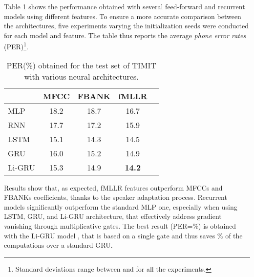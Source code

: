 \documentclass{article}
\begin{document}
Table \ref{tab:res1} shows the performance obtained with several feed-forward and recurrent models using different features. To ensure a more accurate comparison between the architectures, five experiments varying the initialization seeds were conducted for each 
model and feature. The table thus reports the average \textit{phone error rates} (PER)\footnote{Standard deviations range between  and  for all the experiments.}.
\begin{table}[t!]
\caption{PER(\%) obtained for the test set of TIMIT with various neural architectures.}
\centering

\begin{tabular}{l|cccc}  
& MFCC &  FBANK & fMLLR \\ \hline
MLP & 18.2  & 18.7 & 16.7   \\ 
RNN & 17.7  & 17.2  & 15.9   \\ 
LSTM & 15.1  & 14.3  & 14.5   \\ 
GRU & 16.0  & 15.2  & 14.9   \\ 
Li-GRU & 15.3 & 14.9 & \textbf{14.2} \\
\bottomrule
\end{tabular}
\label{tab:res1}
\end{table}
Results show that, as expected, fMLLR features outperform MFCCs and FBANKs coefficients, thanks to the speaker adaptation process. Recurrent models significantly outperform the standard MLP one, especially when using LSTM, GRU, and Li-GRU architecture, that effectively address gradient vanishing through multiplicative gates. The best result (PER=\%) is obtained with the Li-GRU model \cite{li_gru}, that is based on a single gate and thus saves \% of the computations over a standard GRU.
\end{document}
